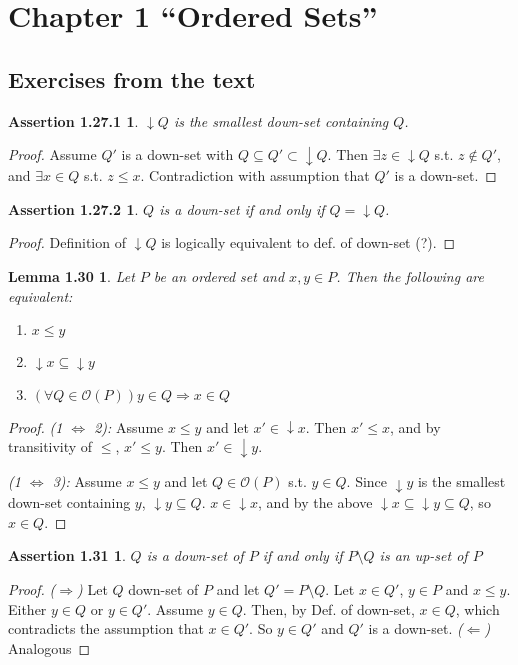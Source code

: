 \section{Chapter 1 ``Ordered Sets''}
\subsection{Exercises from the text}
\newtheorem*{assertion-1.27.1}{Assertion 1.27.1}
\begin{assertion-1.27.1} $\downarrow Q$ is the smallest down-set containing $Q$.
\end{assertion-1.27.1}
\begin{proof} Assume $Q'$ is a down-set with $Q \subseteq Q' \subset \downarrow Q$. Then $\exists z \in \downarrow Q$ s.t. $z \notin Q'$, and $\exists x \in Q$ s.t. $z \leq x$. Contradiction with assumption that $Q'$ is a down-set.
\end{proof}

\newtheorem*{assertion-1.27.2}{Assertion 1.27.2}
\begin{assertion-1.27.2} $Q$ is a down-set if and only if $Q = \downarrow Q$.
\end{assertion-1.27.2}
\begin{proof}
Definition of $\downarrow Q$ is logically equivalent to def. of down-set (?).
\end{proof}

\newtheorem*{lemma-1.30}{Lemma 1.30}
\begin{lemma-1.30} Let $P$ be an ordered set and $x, y \in P$. Then the following are equivalent:
\begin{enumerate}
  \item $x \leq y$
  \item $\downarrow x \subseteq \downarrow y$
  \item $(\forall Q \in \mathcal{O}(P)) y \in Q \Longrightarrow x \in Q$
\end{enumerate}
\end{lemma-1.30}
\begin{proof}
\emph{(1 $\Leftrightarrow$ 2):} Assume $x \leq y$ and let $x' \in \downarrow x$. Then $x' \leq x$, and by transitivity of $\leq$, $x' \leq y$. Then $x' \in \downarrow y$.

\emph{(1 $\Leftrightarrow$ 3):} Assume $x \leq y$ and let $Q \in \mathcal{O}(P)$ s.t. $y \in Q$. Since $\downarrow y$ is the smallest down-set containing $y$, $\downarrow y \subseteq Q$. $x \in \downarrow x$, and by the above $\downarrow x \subseteq \downarrow y \subseteq Q$, so $x \in Q$. 
\end{proof}
\newtheorem*{assertion-1.31}{Assertion 1.31}
\begin{assertion-1.31} $Q$ is a down-set of $P$ if and only if $P \setminus Q$ is an up-set of $P$
\end{assertion-1.31}
\begin{proof} 
\emph{($\Rightarrow$)} Let $Q$ down-set of $P$ and let $Q' = P \setminus Q$. Let $x \in Q'$, $y \in P$ and $x \leq y$. Either $y \in Q$ or $y \in Q'$. Assume $y \in Q$. Then, by Def. of down-set, $x \in Q$, which contradicts the assumption that $x \in Q'$. So $y \in Q'$ and $Q'$ is a down-set.
\emph{($\Leftarrow$)} Analogous 
\end{proof}

